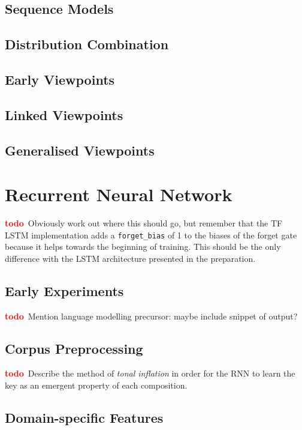 \documentclass[12pt,a4paper,twoside,openright]{report}
\newcommand{\todo}{\textcolor{red}{\textbf{todo}~}}
\begin{document}
\subsection{Sequence Models}

\subsection{Distribution Combination}

\subsection{Early Viewpoints}

\subsection{Linked Viewpoints}

\subsection{Generalised Viewpoints}

\section{Recurrent Neural Network}

\todo Obviously work out where this should go, but remember that the TF LSTM
implementation adds a \texttt{forget\_bias} of 1 to the biases of the forget
gate because it helps towards the beginning of training. This should be the only
difference with the LSTM architecture presented in the preparation.

\subsection{Early Experiments}

\todo Mention language modelling precursor: maybe include snippet of output?

\subsection{Corpus Preprocessing}

\todo Describe the method of \emph{tonal inflation} in order for the RNN to
learn the key as an emergent property of each composition.

\subsection{Domain-specific Features}
\end{document}
